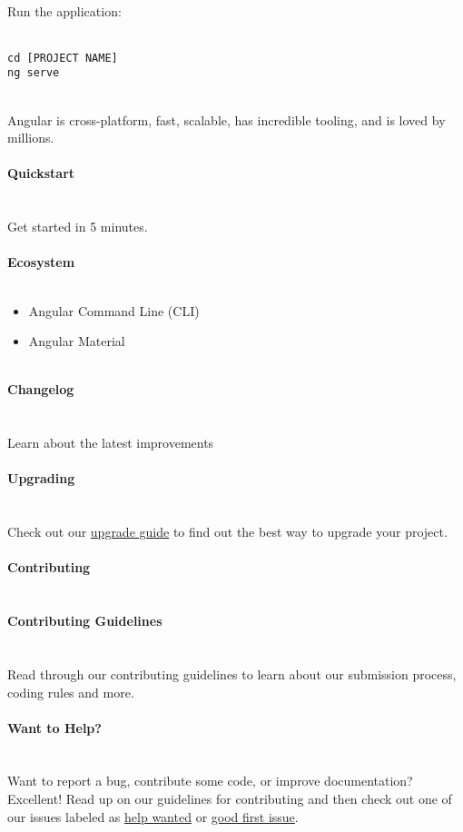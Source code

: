\documentclass{article}
\begin{document}
\\
Run the application:\\
\\
\begin{lstlisting}
cd [PROJECT NAME]
ng serve
\end{lstlisting}
\\
Angular is cross-platform, fast, scalable, has incredible tooling, and is loved by millions.\\
\\
{\noindent \LARGE \textbf{Quickstart}}\\\\
\\
Get started in 5 minutes.\\
\\
{\noindent \LARGE \textbf{Ecosystem}}\\\\
\begin{itemize}
	\item Angular Command Line (CLI)
	\item Angular Material
\end{itemize}
\\
{\noindent \LARGE \textbf{Changelog}}\\\\
\\
Learn about the latest improvements\\
\\
{\noindent \LARGE \textbf{Upgrading}}\\\\
\\
Check out our \href{https://update.angular.io/}{upgrade guide} to find out the best way to upgrade your project.\\
\\
{\noindent \LARGE \textbf{Contributing}}\\\\
\\
{\noindent \Large \textbf{Contributing Guidelines}}\\\\
\\
Read through our contributing guidelines to learn about our submission process, coding rules and more.\\
\\
{\noindent \Large \textbf{Want to Help?}}\\\\
\\
Want to report a bug, contribute some code, or improve documentation? Excellent! Read up on our guidelines for contributing and then check out one of our issues labeled as \href{https://github.com/angular/angular/labels/help%20wanted}{help wanted} or \href{https://github.com/angular/angular/labels/good%20first%20issue}{good first issue}.\\
\end{document}
